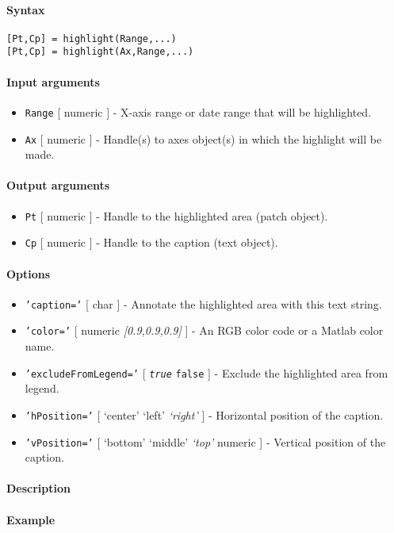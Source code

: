 


	\paragraph{Syntax}

\begin{verbatim}
[Pt,Cp] = highlight(Range,...)
[Pt,Cp] = highlight(Ax,Range,...)
\end{verbatim}

\paragraph{Input arguments}

\begin{itemize}
\item
  \texttt{Range} {[} numeric {]} - X-axis range or date range that will
  be highlighted.
\item
  \texttt{Ax} {[} numeric {]} - Handle(s) to axes object(s) in which the
  highlight will be made.
\end{itemize}

\paragraph{Output arguments}

\begin{itemize}
\item
  \texttt{Pt} {[} numeric {]} - Handle to the highlighted area (patch
  object).
\item
  \texttt{Cp} {[} numeric {]} - Handle to the caption (text object).
\end{itemize}

\paragraph{Options}

\begin{itemize}
\item
  \texttt{'caption='} {[} char {]} - Annotate the highlighted area with
  this text string.
\item
  \texttt{'color='} {[} numeric \textbar{} \emph{{[}0.9,0.9,0.9{]}} {]}
  - An RGB color code or a Matlab color name.
\item
  \texttt{'excludeFromLegend='} {[} \emph{\texttt{true}} \textbar{}
  \texttt{false} {]} - Exclude the highlighted area from legend.
\item
  \texttt{'hPosition='} {[} `center' \textbar{} `left' \textbar{}
  \emph{`right'} {]} - Horizontal position of the caption.
\item
  \texttt{'vPosition='} {[} `bottom' \textbar{} `middle' \textbar{}
  \emph{`top'} \textbar{} numeric {]} - Vertical position of the
  caption.
\end{itemize}

\paragraph{Description}

\paragraph{Example}


